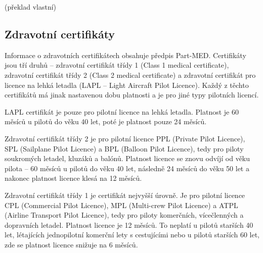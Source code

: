\documentclass[thesis=M,czech]{FITthesis}[2012/06/26]
\begin{document}
 \cite{FTL} (překlad vlastní)

\subsection{Zdravotní certifikáty}
Informace o zdravotních certifikátech obsahuje předpis Part-MED. Certifikáty jsou tří druhů -- zdravotní certifikát třídy 1 (Class 1 medical certificate), zdravotní certifikát třídy 2 (Class 2 medical certificate) a zdravotní certifikát pro licence na lehká letadla (LAPL -- Light Aircraft Pilot Licence). Každý z těchto certifikátů má jinak nastavenou dobu platnosti a je pro jiné typy pilotních licencí.

LAPL certifikát je pouze pro pilotní licence na lehká letadla. Platnost je 60 měsíců u pilotů do věku 40 let, poté je platnost pouze 24 měsíců.

Zdravotní certifikát třídy 2 je pro pilotní licence PPL (Private Pilot Licence), SPL (Sailplane Pilot Licence) a BPL (Balloon Pilot Licence), tedy pro piloty soukromých letadel, kluzáků a balónů. Platnost licence se znovu odvíjí od věku pilota -- 60 měsíců u pilotů do věku 40 let, následně 24 měsíců do věku 50 let a nakonec platnost licence klesá na 12 měsíců.

Zdravotní certifikát třídy 1 je certifikát nejvyšší úrovně. Je pro pilotní licence CPL (Commercial Pilot Licence), MPL (Multi-crew Pilot Licence) a ATPL (Airline Transport Pilot Licence), tedy pro piloty komerčních, vícečlenných a dopravních letadel. Platnost licence je 12 měsíců. To neplatí u pilotů starších 40 let, létajících jednopilotní komerční lety s cestujícími nebo u pilotů starších 60 let, zde se platnost licence snižuje na 6 měsíců. \cite{CAA}
\end{document}
